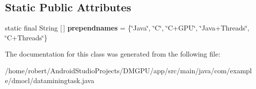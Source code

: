 \subsection*{Static Public Attributes}
\begin{DoxyCompactItemize}
\item 
\mbox{\label{classcom_1_1example_1_1dmocl_1_1dataminingtask_a27dbb6b1fb48631844198bfc5ceea344}} 
static final String \mbox{[}$\,$\mbox{]} {\bfseries prependnames} = \{\char`\"{}Java\char`\"{}, \char`\"{}C\char`\"{}, \char`\"{}C+G\+PU\char`\"{}, \char`\"{}Java+Threads\char`\"{}, \char`\"{}C+Threads\char`\"{}\}
\end{DoxyCompactItemize}


The documentation for this class was generated from the following file\+:\begin{DoxyCompactItemize}
\item 
/home/robert/\+Android\+Studio\+Projects/\+D\+M\+G\+P\+U/app/src/main/java/com/example/dmocl/dataminingtask.\+java\end{DoxyCompactItemize}

